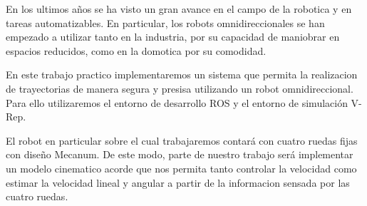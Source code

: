 En los ultimos años se ha visto un gran avance en el campo de la robotica y en tareas automatizables. En particular, los robots omnidireccionales se han empezado a utilizar tanto en la industria, por su capacidad de maniobrar en espacios reducidos, como en la domotica por su comodidad.

En este trabajo practico implementaremos un sistema que permita la realizacion de trayectorias de manera segura y presisa utilizando un robot omnidireccional. Para ello utilizaremos el entorno de desarrollo ROS y el entorno de simulación V-Rep.

El robot en particular sobre el cual trabajaremos contará con cuatro ruedas fijas con diseño Mecanum. De este modo, parte de nuestro trabajo será implementar un modelo cinematico acorde que nos permita tanto controlar la velocidad como estimar la velocidad lineal y angular a partir de la informacion sensada por las cuatro ruedas.
